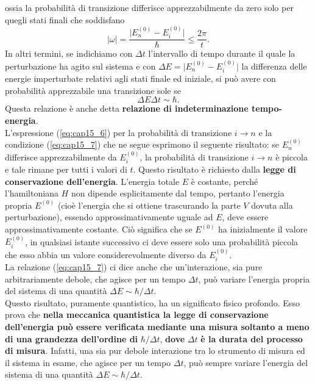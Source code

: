 ossia la probabilità di transizione differisce apprezzabilmente da zero solo per quegli stati finali che soddisfano
\begin{equation}
\vert \omega \vert = \frac{\vert E_n ^{(0)} - E_i ^{(0)}\vert}{\hbar} \leq \frac{2\pi}{t}.
\end{equation}
In altri termini, se indichiamo con $\Delta t$ l'intervallo di tempo durante il quale la perturbazione ha agito sul sistema e con $\Delta E = \vert E_n ^{(0)} - E_i ^{(0)}\vert$ la differenza delle energie imperturbate relativi agli stati finale ed iniziale, si può avere con probabilità apprezzabile una transizione sole se
\begin{equation}
\Delta E \Delta t \sim \hbar .
\label{eq:cap15_7}
\end{equation}
Questa relazione è anche detta \textbf{relazione di indeterminazione tempo-energia}.\\
L'espressione (\ref{eq:cap15_6}) per la probabilità di transizione $i\rightarrow n$ e la condizione (\ref{eq:cap15_7}) che ne segue esprimono il seguente risultato: se $E_n ^{(0)}$ differisce apprezzabilmente da   $E_i ^{(0)}$, la probabilità di transizione $i \rightarrow n$ è piccola e tale rimane per tutti i valori di $t$. Questo risultato è richiesto dalla  \textbf{legge di conservazione dell'energia}. L'energia totale $E$ è costante, perché l'hamiltoniana $H$ non dipende esplicitamente dal tempo, pertanto l'energia propria $E^{(0)}$ (cioè l'energia che si ottiene trascurando la parte $V$ dovuta alla perturbazione), essendo approssimativamente uguale ad $E$, deve essere approssimativamente costante. Ciò significa che se $E^{(0)}$ ha inizialmente il valore $E _i ^{(0)}$, in qualsiasi istante successivo ci deve essere solo una probabilità piccola che esso abbia un valore considerevolmente diverso da $E _i ^{(0)}$.\\
La relazione (\ref{eq:cap15_7}) ci dice anche che un'interazione, sia pure arbitrariamente debole, che agisce per un tempo $\Delta t$, può variare l'energia propria del sistema di una quantità $\Delta E \sim \hbar /\Delta t$.\\
Questo risultato, puramente quantistico, ha un significato fisico profondo. Esso prova che \textbf{nella meccanica quantistica la legge di conservazione dell'energia può essere verificata mediante una misura soltanto a meno di una grandezza dell'ordine di} $\hbar /\Delta t$, \textbf{dove } $\Delta t$ \textbf{è la durata del processo di misura}. Infatti, una sia pur debole interazione tra lo strumento di misura ed il sistema in esame, che agisce per un tempo $\Delta t $, può sempre variare l'energia del sistema di una quantità $\Delta E \sim \hbar /\Delta t$.\\
